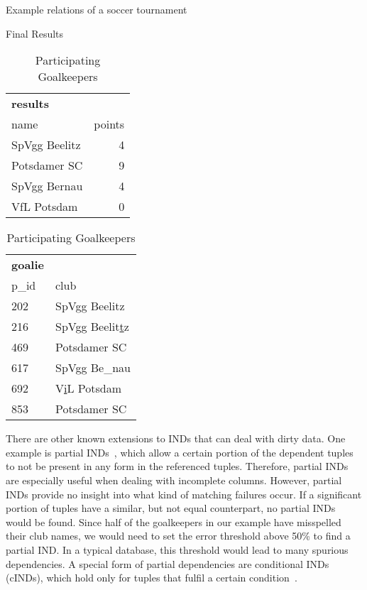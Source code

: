 \begin{table}[ht]
    \caption{Example relations of a soccer tournament}
    \label{table:example}
    \begin{subtable}[t]{0.49\columnwidth}
      \setcounter{table}{1}
      \caption{Final Results}
      \label{table:example:results}
      \centering
        \begin{tabular}{@{}lr@{}}
            \toprule
            \textbf{results}    &           \\
            name                & points    \\ 
            \midrule
            SpVgg Beelitz       & 4         \\ 
            Potsdamer SC        & 9         \\ 
            SpVgg Bernau        & 4         \\ 
            VfL Potsdam         & 0         \\ 
            \bottomrule
        \end{tabular}
    \end{subtable}
    \begin{subtable}[t]{0.49\columnwidth}
      \centering
        \caption{Participating Goalkeepers}
        \label{table:example:goalkeeper}
        \begin{tabular}{@{}ll@{}}
            \toprule
            \textbf{goalie} &                   \\
            p\_id               & club              \\ 
            \midrule
            202                 & SpVgg Beelitz     \\ 
            216                 & SpVgg Beelit\underline{t}z    \\
            469                 & Potsdamer SC      \\
            617                 & SpVgg Be\_nau       \\
            692                 & V\underline{i}L Potsdam       \\
            853                 & Potsdamer SC      \\
            \bottomrule
        \end{tabular}
    \end{subtable} 
\end{table}

There are other known extensions to INDs that can deal with dirty data.
One example is partial INDs~\cite{Bauckmann07}, which allow a certain portion of the dependent tuples to not be present in any form in the referenced tuples.
Therefore, partial INDs are especially useful when dealing with incomplete columns.
However, partial INDs provide no insight into what kind of matching failures occur.
If a significant portion of tuples have a similar, but not equal counterpart, no partial INDs would be found.
Since half of the goalkeepers in our example have misspelled their club names, we would need to set the error threshold above 50\% to find a partial IND.
In a typical database, this threshold would lead to many spurious dependencies.
A special form of partial dependencies are conditional INDs (cINDs), which hold only for tuples that fulfil a certain condition~\cite{Bravo07,Bauckmann12}.

